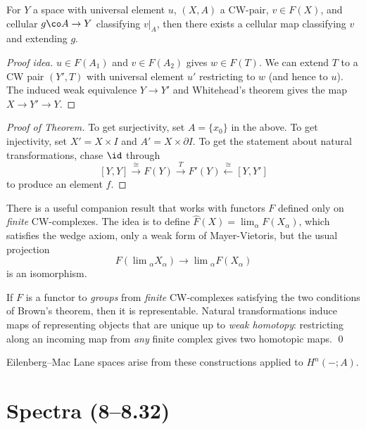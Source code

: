 \begin{lemma}
For $Y$ a space with universal element $u$, $(X, A)$ a CW-pair, $v \in F(X)$, and cellular $g\co A \to Y$ classifying $v|_A$, then there exists a cellular map classifying $v$ and extending $g$.
\end{lemma}
\begin{proof}[Proof idea]
 $u \in F(A_1)$ and $v \in F(A_2)$ gives $w \in F(T)$.  We can extend $T$ to a CW pair $(Y', T)$ with universal element $u'$ restricting to $w$ (and hence to $u$).  The induced weak equivalence $Y \to Y'$ and Whitehead's theorem gives the map $X \to Y' \to Y$.
\end{proof}

\begin{proof}[Proof of Theorem]
To get surjectivity, set $A = \{x_0\}$ in the above.  To get injectivity, set $X' = X \times I$ and $A' = X \times \partial I$.  To get the statement about natural transformations, chase $\id$ through \[[Y, Y] \xrightarrow\cong F(Y) \xrightarrow{T} F'(Y) \xleftarrow\cong [Y, Y']\] to produce an element $f$.
\end{proof}

There is a useful companion result that works with functors $F$ defined only on \emph{finite} CW-complexes.  The idea is to define $\widehat F(X) = \lim_\alpha F(X_\alpha)$, which satisfies the wedge axiom, only a weak form of Mayer-Vietoris, but the usual projection \[F(\lim{}_\alpha X_\alpha) \to \lim{}_\alpha F(X_\alpha)\] is an isomorphism.

\begin{theorem}[Adams]
If $F$ is a functor to \emph{groups} from \emph{finite} CW-complexes satisfying the two conditions of Brown's theorem, then it is representable.  Natural transformations induce maps of representing objects that are unique up to \emph{weak homotopy}: restricting along an incoming map from \emph{any} finite complex gives two homotopic maps. \qed
\end{theorem}

\begin{example}
Eilenberg--Mac Lane spaces arise from these constructions applied to $H^n(-; A)$.
\end{example}




\section{Spectra (8--8.32)}

